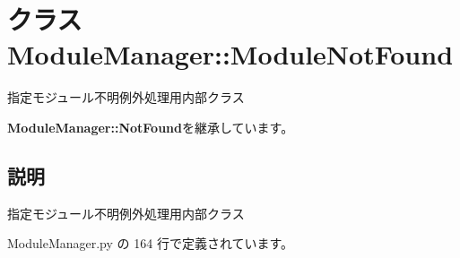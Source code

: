 \section{クラス ModuleManager::ModuleNotFound}
\label{classsource__py_1_1_module_manager_1_1_module_manager_1_1_module_not_found}
指定モジュール不明例外処理用内部クラス  


{\bf ModuleManager::NotFound}を継承しています。



\subsection{説明}
指定モジュール不明例外処理用内部クラス 

 ModuleManager.py の 164 行で定義されています。